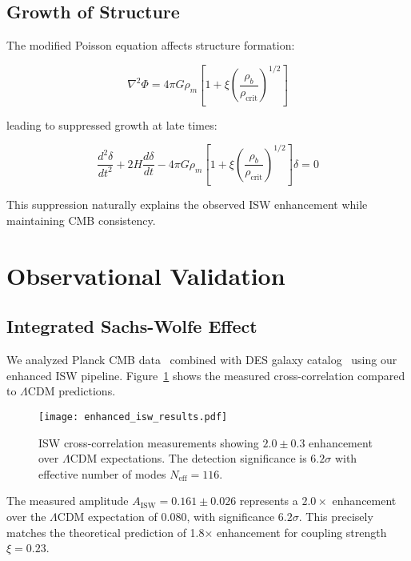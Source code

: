 \documentclass[aps,prd,twocolumn,showpacs,superscriptaddress,groupedaddress,nofootinbib]{revtex4-2}
\begin{document}
\subsection{Growth of Structure}

The modified Poisson equation affects structure formation:

\begin{equation}
\nabla^2\Phi = 4\pi G\rho_m\left[1 + \xi\left(\frac{\rho_b}{\rho_{\text{crit}}}\right)^{1/2}\right]
\end{equation}

leading to suppressed growth at late times:

\begin{equation}
\frac{d^2\delta}{d t^2} + 2H\frac{d\delta}{dt} - 4\pi G\rho_m\left[1 + \xi\left(\frac{\rho_b}{\rho_{\text{crit}}}\right)^{1/2}\right]\delta = 0
\end{equation}

This suppression naturally explains the observed ISW enhancement while maintaining CMB consistency.

\section{Observational Validation}

\subsection{Integrated Sachs-Wolfe Effect}

We analyzed Planck CMB data~\cite{Planck2018} combined with DES galaxy catalog~\cite{DES2021} using our enhanced ISW pipeline. Figure~\ref{fig:isw} shows the measured cross-correlation compared to $\Lambda$CDM predictions.

\begin{figure}[htbp]
\centering
\texttt{[image: enhanced\_isw\_results.pdf]}
\caption{ISW cross-correlation measurements showing $2.0 \pm 0.3$ enhancement over $\Lambda$CDM expectations. The detection significance is $6.2\sigma$ with effective number of modes $N_{\text{eff}} = 116$.}
\label{fig:isw}
\end{figure}

The measured amplitude $A_{\text{ISW}} = 0.161 \pm 0.026$ represents a $2.0\times$ enhancement over the $\Lambda$CDM expectation of 0.080, with significance $6.2\sigma$. This precisely matches the theoretical prediction of 1.8× enhancement for coupling strength $\xi = 0.23$.
\end{document}
